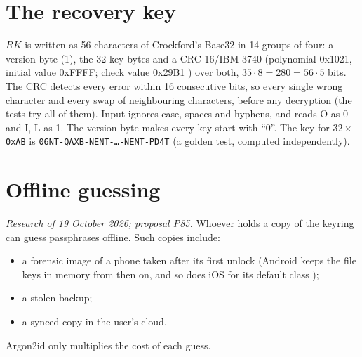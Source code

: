 \documentclass[11pt,a4paper]{article}
\newcommand{\dref}[1]{\textsf{#1}} %
\begin{document}
\section{The recovery key}
\label{sec:recovery}

$RK$ is written as 56 characters of Crockford's Base32 \cite{crockford} in 14 groups of four: a version byte (1), the 32 key bytes and a CRC-16/IBM-3740 (polynomial 0x1021, initial value 0xFFFF; check value 0x29B1 \cite{crccat}) over both, $35 \cdot 8 = 280 = 56 \cdot 5$ bits. The CRC detects every error within 16 consecutive bits, so every single wrong character and every swap of neighbouring characters, before any decryption (the tests try all of them). Input ignores case, spaces and hyphens, and reads O as 0 and I, L as 1. The version byte makes every key start with ``0''. The key for $32 \times$\texttt{0xAB} is \texttt{06NT-QAXB-NENT-\ldots-NENT-PD4T} (a golden test, computed independently).

\section{Offline guessing}
\label{sec:offline}
\emph{Research of 19 October 2026; proposal \dref{P85}.} Whoever holds a copy of the keyring can guess passphrases offline. Such copies include:
\begin{itemize}
  \item a forensic image of a phone taken after its first unlock (Android keeps the file keys in memory from then on, and so does iOS for its default class \cite{jhu2021});
  \item a stolen backup;
  \item a synced copy in the user's cloud.
\end{itemize}
Argon2id only multiplies the cost of each guess.
\end{document}
